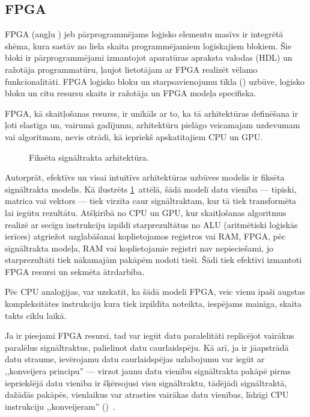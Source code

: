 \subsection{FPGA} \label{sec:fpga}
FPGA (angļu ) jeb
pārprogrammējams loģisko elementu masīvs ir integrētā shēma, kura sastāv no
liela skaita programmējamiem loģiskajiem blokiem. Šie bloki ir pārprogrammējami
izmantojot aparatūras apraksta valodas (HDL) un ražotāja programmatūru,
ļaujot lietotājam ar FPGA realizēt vēlamo funkcionalitāti.
FPGA loģisko bloku un starpsavienojumu tīkla ()
uzbūve, loģisko bloku un citu resursu skaits ir ražotāja un
FPGA modeļa specifiska. \cite{JIS}

FPGA, kā skaitļošanas resurss, ir unikāls ar to, ka tā arhitektūras definēšana
ir ļoti elastīga un, vairumā gadījumu, arhitektūru pielāgo veicamajam
uzdevumam vai algoritmam, nevis otrādi, kā iepriekš apskatītajiem CPU un GPU.

\begin{figure}[tbh]
	\centering
	\def\svgscale{1.2}
	{}
	\caption{Fiksēta signāltrakta arhitektūra.}
	\label{fig:fpga-arch}
\end{figure}
Autorprāt, efektīvs un visai intuitīvs arhitektūras uzbūves modelis ir
fiksēta signāltrakta modelis. Kā ilustrēts \ref{fig:fpga-arch}~attēlā, šādā
modelī datu vienība --- tipiski, matrica vai vektors --- tiek virzīta caur
signāltraktam, kur tā tiek transformēta lai iegūtu rezultātu. Atšķirībā no
CPU un GPU, kur skaitļošanas algoritmus realizē ar secīgu instrukciju izpildi
starprezultātus no ALU (aritmētiski loģiskās ierīces)
atgriežot uzglabāšanai koplietojamos reģistros vai RAM,
FPGA, pēc signāltrakta modeļa, RAM vai koplietojamie reģistri nav
nepieciešami, jo starprezultāti tiek nākamajām pakāpēm nodoti tieši.
Šādi tiek efektīvi izmantoti FPGA resursi un sekmēta ātrdarbība.

Pēc CPU analoģijas, var uzskatīt, ka šādā modelī FPGA, veic vienu
īpaši augstas kompleksitātes instrukciju kura tiek izpildīta noteikta,
iespējams mainīga, skaita takts ciklu laikā.

Ja ir pieejami FPGA resursi, tad var iegūt datu paralelitāti replicējot 
vairākus paralēlus signāltraktus, palielinot datu caurlaidspēju. Kā arī, ja ir
jāapstrādā datu straume, ievērojamu datu caurlaidspējas uzlabojumu var
iegūt ar ,,konveijera principu'' --- virzot jaunu datu vienību
signāltrakta pakāpē pirms iepriekšējā datu vienība ir šķērsojusi visu
signāltraktu, tādējādi signāltraktā, dažādās pakāpēs, vienlaikus
var atrasties vairākas datu vienības, līdzīgi CPU instrukciju ,,konveijeram''
()~\cite{Flynn-arch}.

